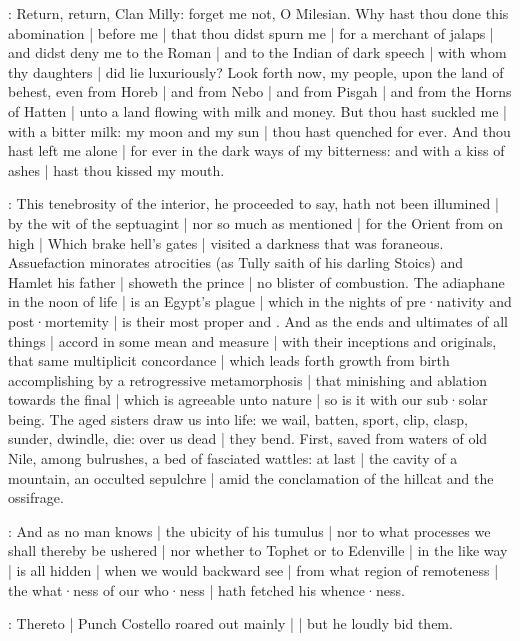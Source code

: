\begin{omitted}

\stephen:
Return,
return,
Clan Milly:
forget me not,
O Milesian.
Why hast thou done this abomination |
before me |
that thou didst spurn me |
for a merchant of jalaps |
and didst deny me to the Roman |
and to the Indian of dark speech |
with whom thy daughters |
did lie luxuriously?
Look forth now,
my people,
upon the land of behest,
even from Horeb |
and from Nebo |
and from Pisgah |
and from the Horns of Hatten |
unto a land flowing with milk and money.
But thou hast suckled me |
with a bitter milk:
my moon and my sun |
thou hast quenched for ever.
And thou hast left me alone |
for ever in the dark ways of my bitterness:
and with a kiss of ashes |
hast thou kissed my mouth.

:
This tenebrosity of the interior,
he proceeded to say,
hath not been illumined |
by the wit of the septuagint |
nor so much as mentioned |
for the Orient from on high |
Which brake hell's gates |
visited a darkness that was foraneous.
Assuefaction minorates atrocities
(as Tully saith of his darling Stoics)
and Hamlet his father |
showeth the prince |
no blister of combustion.
The adiaphane in the noon of life |
is an Egypt's plague |
which in the nights of pre·nativity and post·mortemity |
is their most proper  and .
And as the ends and ultimates of all things |
accord in some mean and measure |
with their inceptions and originals,
that same multiplicit concordance |
which leads forth growth from birth
accomplishing by a retrogressive metamorphosis |
that minishing and ablation towards the final |
which is agreeable unto nature |
so is it with our sub·solar being.
The aged sisters draw us into life:
we wail,
batten,
sport,
clip,
clasp,
sunder,
dwindle,
die:
over us dead |
they bend.
First,
saved from waters of old Nile,
among bulrushes,
a bed of fasciated wattles:
at last |
the cavity of a mountain,
an occulted sepulchre |
amid the conclamation of the hillcat and the ossifrage.
\end{omitted}

\stephen:
And as no man knows |
the ubicity of his tumulus |
nor to what processes we shall thereby be ushered |
nor whether to Tophet or to Edenville |
in the like way |
is all hidden |
when we would backward see |
from what region of remoteness |
the what·ness of our who·ness |
hath fetched his whence·ness.


:
Thereto |
Punch Costello roared out mainly |
 |
but he loudly bid them.

